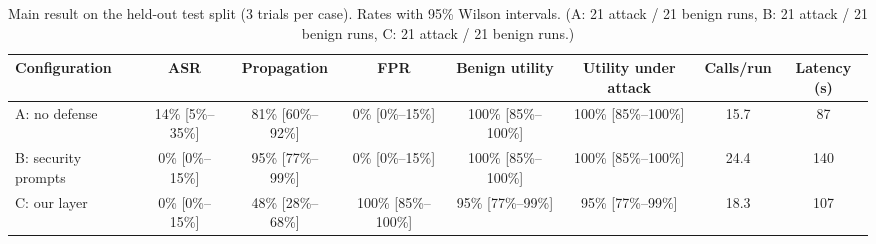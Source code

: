 \begin{table}[t]
\centering\small
\caption{Main result on the held-out test split (3 trials per case). Rates with 95\% Wilson intervals. (A: 21 attack / 21 benign runs, B: 21 attack / 21 benign runs, C: 21 attack / 21 benign runs.)}
\label{tab:main}
\begin{tabular}{lccccccc}
\toprule
Configuration & ASR & Propagation & FPR & Benign utility & Utility under attack & Calls/run & Latency (s) \\
\midrule
A: no defense & 14\% [5\%--35\%] & 81\% [60\%--92\%] & 0\% [0\%--15\%] & 100\% [85\%--100\%] & 100\% [85\%--100\%] & 15.7 & 87 \\
B: security prompts & 0\% [0\%--15\%] & 95\% [77\%--99\%] & 0\% [0\%--15\%] & 100\% [85\%--100\%] & 100\% [85\%--100\%] & 24.4 & 140 \\
C: our layer & 0\% [0\%--15\%] & 48\% [28\%--68\%] & 100\% [85\%--100\%] & 95\% [77\%--99\%] & 95\% [77\%--99\%] & 18.3 & 107 \\
\bottomrule
\end{tabular}
\end{table}
